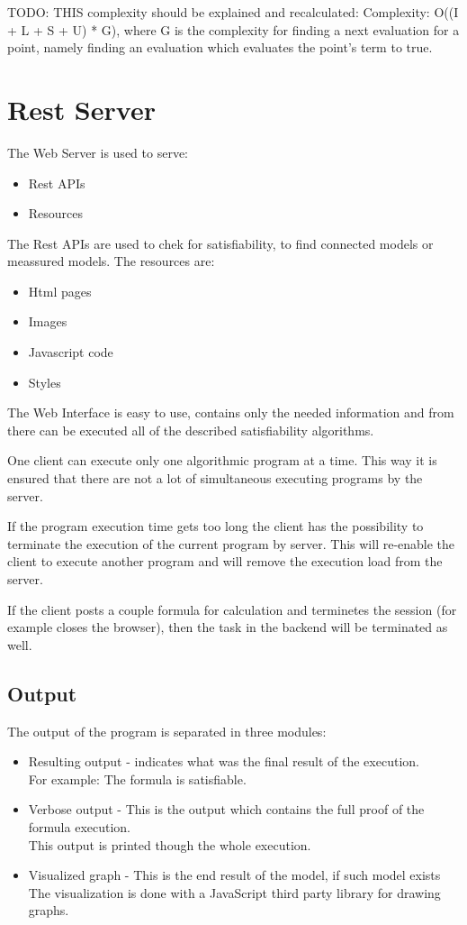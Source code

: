 \documentclass{article}
\begin{document}
			TODO: THIS complexity should be explained and recalculated:
			\newline
			Complexity: O((I + L + S + U) * G), where G is the complexity for finding a next evaluation for a point, 
			namely finding an evaluation which evaluates the point's term to true.

	\newpage
	\section{Rest Server}
		The Web Server is used to serve:
		\begin{itemize}
			\item Rest APIs
			\item Resources
		\end{itemize}
		The Rest APIs are used to chek for satisfiability, to find connected models or meassured models.
		\newline
		The resources are:
		\begin{itemize}
			\item Html pages
			\item Images 
			\item Javascript code
			\item Styles
		\end{itemize}
		The Web Interface is easy to use, contains only the needed information and from there 
		can be executed all of the described satisfiability algorithms.

		One client can execute only one algorithmic program at a time. 
		This way it is ensured that there are not a lot of simultaneous executing programs by the server.
		
		If the program execution time gets too long the client has the possibility to terminate the execution 
		of the current program by server. This will re-enable the client to execute another program and will remove 
		the execution load from the server.

		If the client posts a couple formula for calculation and terminetes the session (for example closes the browser),
		then the task in the backend will be terminated as well.

		\subsection*{Output}
		The output of the program is separated in three modules:
		\begin{itemize}
			\item Resulting output - indicates what was the final result of the execution. \\
				For example: The formula is satisfiable.
			\item Verbose output - This is the output which contains the full proof of the formula execution. \\
				This output is printed though the whole execution.
			\item Visualized graph - This is the end result of the model, if such model exists \\
				The visualization is done with a JavaScript third party library for drawing graphs.
		\end{itemize}
\end{document}
